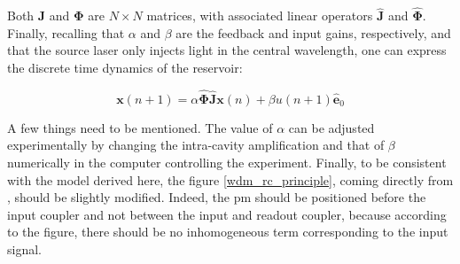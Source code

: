 Both $\mathbf{J}$ and $\mathbf{\Phi}$ are $N\times N$ matrices, with associated linear operators $\hat{\mathbf{J}}$ and $\hat{\mathbf{\Phi}}$. Finally, recalling that $\alpha$ and $\beta$ are the feedback and input gains, respectively, and that the source laser only injects light in the central wavelength, one can express the discrete time dynamics of the reservoir:

\begin{equation}
	\mathbf{x}(n+1) = \alpha \hat{\mathbf{\Phi}} \hat{\mathbf{J}} \mathbf{x}(n) + \beta u(n+1) \hat{\mathbf{e}}_0
\end{equation}

A few things need to be mentioned. The value of $\alpha$ can be adjusted experimentally by changing the intra-cavity amplification and that of $\beta$ numerically in the computer controlling the experiment. Finally, to be consistent with the model derived here, the figure \ref{wdm_rc_principle}, coming directly from \cite{AkroutAkram2016Pprc}, should be slightly modified. Indeed, the \gls{pm} should be positioned before the input coupler and not between the input and readout coupler, because according to the figure, there should be no inhomogeneous term corresponding to the input signal.


